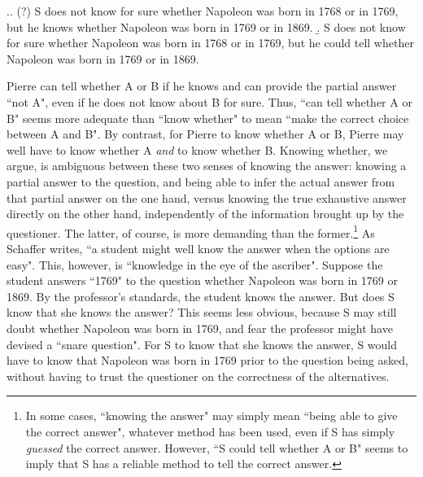 \ex.\a. (?) S does not know for sure whether Napoleon was born in
1768 or in 1769, but he knows whether Napoleon was born in 1769 or
in 1869. \b. S does not know for sure whether Napoleon was born in
1768 or in 1769, but he could tell whether Napoleon was born in
1769 or in 1869.


%

Pierre can tell whether A or B if he knows and can provide the
partial answer ``not A", even if he does not know about B for
sure. Thus, ``can tell whether A or B" seems more adequate than
``know whether" to mean ``make the correct choice between A and
B". By contrast, for Pierre to know whether A or B, Pierre may
well have to know whether A \emph{and} to know whether B. Knowing
whether, we argue, is ambiguous between these two senses of
knowing the answer: knowing a partial answer to the question, and
being able to infer the actual answer from that partial answer on
the one hand, versus knowing the true exhaustive answer directly
on the other hand, independently of the information brought up by
the questioner. The latter, of course, is more demanding than the
former.\footnote{In some cases, ``knowing the answer" may simply
mean ``being able to give the correct answer", whatever method has
been used, even if S has simply \emph{guessed} the correct answer.
However, ``S could tell whether A or B" seems to imply that S has
a reliable method to tell the correct answer.} As Schaffer writes,
``a student might well know the answer when the options are easy".
This, however, is ``knowledge in the eye of the ascriber". Suppose
the student answers ``1769" to the question whether Napoleon was
born in 1769 or 1869. By the professor's standards, the student
knows the answer. But does S know that she knows the answer? This
seems less obvious, because S may still doubt whether Napoleon was
born in 1769, and fear the professor might have devised a ``snare
question". For S to know that she knows the answer, S would have
to know that Napoleon was born in 1769 prior to the question being
asked, without having to trust the questioner on the correctness
of the alternatives.
